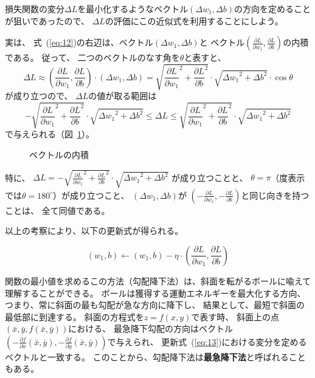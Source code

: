 損失関数の変分$\Delta L$を最小化するようなベクトル$(\Delta w_1, \Delta b)$の方向を定めることが狙いであったので、
$\Delta L$の評価にこの近似式を利用することにしよう。

実は、
式~(\ref{eq:12})の右辺は、ベクトル$(\Delta w_1, \Delta b)$と
ベクトル$\left(\frac{\partial L}{\partial w_1}, \frac{\partial L}{\partial b}\right)$の内積である。
従って、
二つのベクトルのなす角を$\theta$と表すと、
\[
  \Delta L
  \approx 
  \left(\frac{\partial L}{\partial w_1}, \frac{\partial L}{\partial b}\right)
  \cdot (\Delta w_1, \Delta b)
  = \sqrt{\frac{\partial L}{\partial w_1}^2 + \frac{\partial L}{\partial b}^2} \cdot
  \sqrt{{\Delta w_1}^2 + {\Delta b}^2} \cdot \cos\theta
\]
が成り立つので、
$\Delta L$の値が取る範囲は
\[
  -\sqrt{\frac{\partial L}{\partial w_1}^2 + \frac{\partial L}{\partial b}^2} \cdot
  \sqrt{{\Delta w_1}^2 + {\Delta b}^2}
  \le \Delta L \le
  \sqrt{\frac{\partial L}{\partial w_1}^2 + \frac{\partial L}{\partial b}^2} \cdot
  \sqrt{{\Delta w_1}^2 + {\Delta b}^2}
\]
で与えられる（図~\ref{fig:inner-product}）。

\begin{figure}
  \centering
  
  \caption{ベクトルの内積}
  \label{fig:inner-product}
\end{figure}


特に、
$\Delta L =   -\sqrt{\frac{\partial L}{\partial w_1}^2 + \frac{\partial L}{\partial b}^2} \cdot
\sqrt{{\Delta w_1}^2 + {\Delta b}^2}$
が成り立つことと、
$\theta = \pi$（度表示では$\theta = 180^\circ$）が成り立つこと、
$(\Delta w_1, \Delta b)$が
$\left(-\frac{\partial L}{\partial w_1}, -\frac{\partial L}{\partial b}\right)$と同じ向きを持つことは、
全て同値である。

以上の考察により、以下の更新式が得られる。
\begin{screen}
\begin{equation}\label{eq:13}
  (w_1, b) \leftarrow
  (w_1, b) - \eta \cdot \left(\frac{\partial L}{\partial w_1},
    \frac{\partial L}{\partial b}\right)
\end{equation}
\end{screen}


関数の最小値を求めるこの方法（勾配降下法）は、斜面を転がるボールに喩えて理解することができる。
ボールは獲得する運動エネルギーを最大化する方向、
つまり、常に斜面の最も勾配が急な方向に降下し、
結果として、最短で斜面の最低部に到達する。
斜面の方程式を$z = f(x, y)$で表す時、
斜面上の点$(\bar x, \bar y, f(\bar x, \bar y))$における、
最急降下勾配の方向はベクトル
$\left(-\frac{\partial f}{\partial x}(\bar x, \bar y),
  -\frac{\partial f}{\partial y}(\bar x, \bar y)\right)$で与えられ、
更新式~(\ref{eq:13})における変分を定めるベクトルと一致する。
このことから、勾配降下法は\textbf{最急降下法}と呼ばれることもある。

